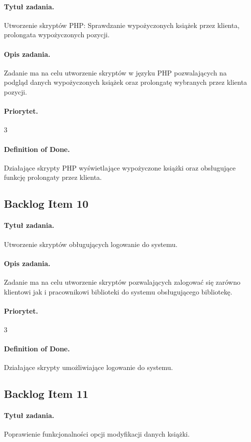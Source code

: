 \documentclass[a4paper]{article}
\begin{document}
\paragraph{Tytuł zadania.} Utworzenie skryptów PHP: Sprawdzanie wypożyczonych książek przez klienta, prolongata wypożyczonych pozycji.
\paragraph{Opis zadania.} Zadanie ma na celu utworzenie skryptów w języku PHP pozwalających na podgląd danych wypożyczonych książek oraz prolongatę wybranych przez klienta pozycji.
\paragraph{Priorytet.} 3
\paragraph{Definition of Done.} Działające skrypty PHP wyświetlające wypożyczone książki oraz obsługujące funkcję prolongaty przez klienta.

\subsection{Backlog Item 10}
\paragraph{Tytuł zadania.} Utworzenie skryptów obługujących logowanie do systemu.
\paragraph{Opis zadania.} Zadanie ma na celu utworzenie skryptów pozwalających zalogować się zarówno klientowi jak i pracownikowi biblioteki do systemu obsługującego bibliotekę.
\paragraph{Priorytet.} 3
\paragraph{Definition of Done.} Działające skrypty umożliwiające logowanie do systemu.

\subsection{Backlog Item 11}
\paragraph{Tytuł zadania.}Poprawienie funkcjonalności opcji modyfikacji danych książki.
\end{document}
